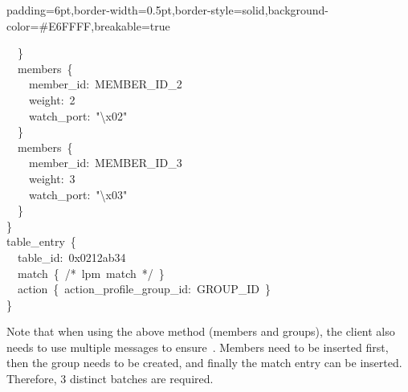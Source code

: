 \documentclass[11pt]{article}
\begin{document}
{\begin{mdbmargintb}{6pt}{6pt}
\begin{mdblock}{padding=6pt,border-width=0.5pt,border-style=solid,background-color=\#E6FFFF,breakable=true}
\begin{mdpre}
{{~~\}\\
~~members~\{\\
~~~~member\_id:~MEMBER\_ID\_2\\
~~~~weight:~{2}\\
~~~~watch\_port:~{"}{\textbackslash{}x02}{"}\\
~~\}\\
~~members~\{\\
~~~~member\_id:~MEMBER\_ID\_3\\
~~~~weight:~{3}\\
~~~~watch\_port:~{"}{\textbackslash{}x03}{"}\\
~~\}\\
\}\\
table\_entry~\{\\
~~table\_id:~{0x0212ab34}\\
~~match~\{~/*~lpm~match~*/~\}\\
~~action~\{~action\_profile\_group\_id:~GROUP\_ID~\}\\
\}}}%
\end{mdpre}%
\end{mdblock}%
\end{mdbmargintb}%

\noindent{}Note that when using the above method (members and groups), the client also
needs to use multiple messages to ensure~. Members need to be inserted
first, then the group needs to be created, and finally the match entry can be
inserted. Therefore, 3 distinct  batches are required.%

}
\end{document}
